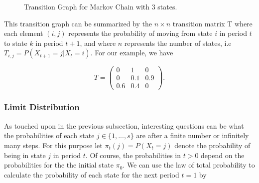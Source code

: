 \documentclass[12pt,english,a4paper,oneside]{article}
\theoremstyle{definition}
\theoremstyle{definition}
\theoremstyle{definition}
\theoremstyle{definition}
\theoremstyle{remark}
\begin{document}
\begin{figure}[H]
\label{fig:ex1}


\centering


\caption{Transition Graph for Markov Chain with 3 states.}
\end{figure}

\noindent
This transition graph can be summarized by the \(n \times n\) transition matrix T where each element \((i,j)\) represents the probability of moving from state \(i\) in period \(t\) to state \(k\) in period \(t+1\), and where \(n\) represents the number of states, i.e \(T_{i,j} = P(X_{t+1}=j | X_t = i)\). For our example, we have

\begin{equation}
\label{eq:transition-matrix}
T=
\begin{pmatrix}
0 & 1 & 0\\
0 & 0.1 & 0.9\\
0.6 & 0.4 & 0
\end{pmatrix}
.
\end{equation}

\hypertarget{limit-distribution}{%
\subsubsection{Limit Distribution}\label{limit-distribution}}

As touched upon in the previous subsection, interesting questions can be what the probabilities of each state \(j \in \{1, ..., s\}\) are after a finite number or infinitely many steps. For this purpose let \(\pi_t (j) = P(X_t = j)\) denote the probability of being in state \(j\) in period \(t\). Of course, the probabilities in \(t>0\) depend on the probabilities for the the initial state \(\pi_0\). We can use the law of total probability to calculate the probability of each state for the next period \(t=1\) by
\end{document}
